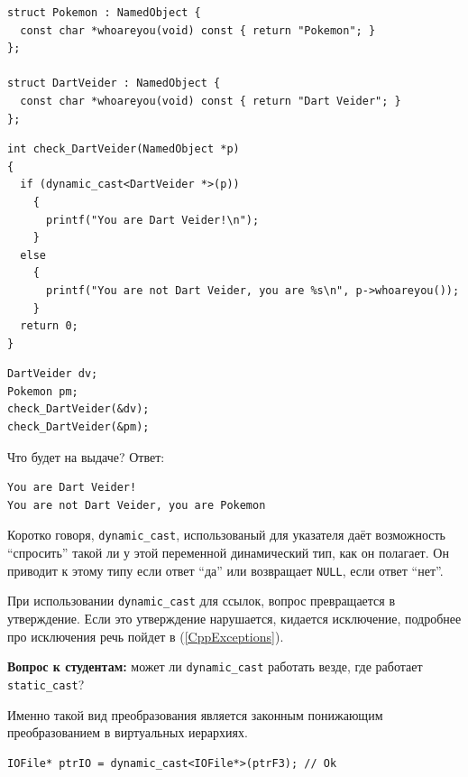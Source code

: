 \documentclass[a4paper,12pt,oneside]{article}
\newif\ifanswers
\begin{document}
\begin{lstlisting}
struct Pokemon : NamedObject {
  const char *whoareyou(void) const { return "Pokemon"; }
};

struct DartVeider : NamedObject {
  const char *whoareyou(void) const { return "Dart Veider"; }
};
\end{lstlisting}

\begin{lstlisting}
int check_DartVeider(NamedObject *p)
{
  if (dynamic_cast<DartVeider *>(p))
    {
      printf("You are Dart Veider!\n");
    }
  else
    {
      printf("You are not Dart Veider, you are %s\n", p->whoareyou());
    }
  return 0;
}
\end{lstlisting}

\begin{lstlisting}
DartVeider dv;
Pokemon pm;
check_DartVeider(&dv);
check_DartVeider(&pm);
\end{lstlisting}

Что будет на выдаче? Ответ:

\begin{verbatim}
You are Dart Veider!
You are not Dart Veider, you are Pokemon
\end{verbatim}

Коротко говоря, \lstinline!dynamic_cast!, использованый для указателя даёт возможность ``спросить'' такой ли у этой переменной динамический тип, как он полагает. Он приводит к этому типу если ответ ``да'' или возвращает \lstinline!NULL!, если ответ ``нет''.

При использовании \lstinline!dynamic_cast! для ссылок, вопрос превращается в утверждение. Если это утверждение нарушается, кидается исключение, подробнее про исключения речь пойдет в (\ref{CppExceptions}).

\textbf{Вопрос к студентам:} может ли \lstinline!dynamic_cast! работать везде, где работает \lstinline!static_cast!?

\ifanswers
Правильный ответ: нет \lstinline!dynamic_cast! очень важно, чтобы в базовом классе была хотя бы одна виртуальная функция -- если таблицы виртуальных методов не будет существовать, динамическое приведение не будет работать.
\fi

Именно такой вид преобразования является законным понижающим преобразованием в виртуальных иерархиях.

\begin{lstlisting}
IOFile* ptrIO = dynamic_cast<IOFile*>(ptrF3); // Ok
\end{lstlisting}
\end{document}
